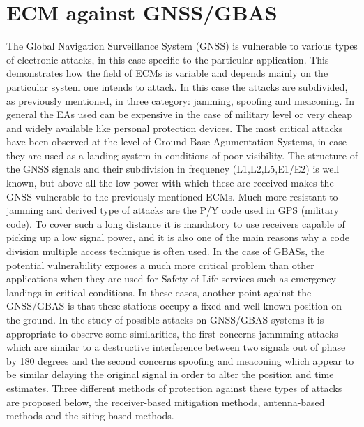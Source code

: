 \documentclass[12pt]{report}
\begin{document}
\section{ECM against GNSS/GBAS}
The Global Navigation Surveillance System (GNSS) is vulnerable to various types of electronic attacks, in this case specific to the particular application. This demonstrates how the field of ECMs is variable and depends mainly on the particular system one intends to attack. In this case the attacks are subdivided, as previously mentioned, in three category: jamming, spoofing and meaconing.  In general the EAs used can be expensive in the case of military level or very cheap and widely available like personal protection devices. The most critical attacks have been observed at the level of Ground Base Agumentation Systems, in case they are used as a landing system in conditions of poor visibility. The structure of the GNSS signals and their subdivision in frequency (L1,L2,L5,E1/E2) is well known, but above all the low power with which these are received makes the GNSS vulnerable to the previously mentioned ECMs. Much more resistant to jamming and derived type of attacks are the P/Y code used in GPS (military code). To cover such a long distance it is mandatory to use receivers capable of picking up a low signal power, and it is also one of the main reasons why a code division multiple access technique is often used. In the case of GBASs, the potential vulnerability exposes a much more critical problem than other applications when they are used for Safety of Life services such as emergency landings in critical conditions. In these cases, another point against the GNSS/GBAS is that these stations occupy a fixed and well known position on the ground. In the study of possible attacks on GNSS/GBAS systems it is appropriate to observe some similarities, the first concerns jammming attacks which are similar to a destructive interference between two signals out of phase by 180 degrees and the second concerns spoofing and meaconing which appear to be similar delaying the original signal in order to alter the position and time estimates. Three different methods of protection against these types of attacks are proposed below, the receiver-based mitigation methods, antenna-based methods and the siting-based methods. 
\end{document}
